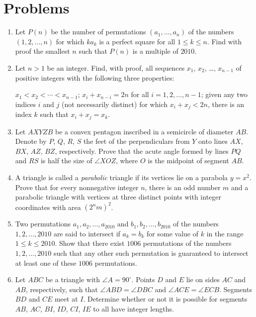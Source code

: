 \documentclass[11pt]{scrartcl}
\begin{document}
\section{Problems}
\begin{enumerate}[\bfseries 1.]
\item %
Let $P(n)$ be the number of permutations $(a_1, \dots, a_n)$
of the numbers $(1, 2, \dots, n)$ for which $ka_k$ is a perfect square
for all $1 \leq k \leq n$.
Find with proof the smallest $n$ such that $P (n)$ is a multiple of $2010$.

\item %
Let $n > 1$ be an integer.  Find, with proof, all sequences
$x_1$, $x_2$, \dots, $x_{n-1}$ of positive integers
with the following three properties:
\begin{enumerate}[(a)]
 \ii $x_1 < x_2 < \dotsb < x_{n-1}$;
 \ii $x_i + x_{n-i} = 2n$ for all $i = 1, 2, \dots , n - 1$;
 \ii given any two indices $i$ and $j$ (not necessarily distinct)
 for which $x_i + x_j < 2n$,
 there is an index $k$ such that $x_i + x_j = x_k$.
\end{enumerate}

\item %
Let $AXYZB$ be a convex pentagon inscribed in a semicircle of diameter $AB$.
Denote by $P$, $Q$, $R$, $S$ the feet of the perpendiculars
from $Y$ onto lines $AX$, $BX$, $AZ$, $BZ$, respectively.
Prove that the acute angle formed by lines $PQ$ and $RS$
is half the size of $\angle XOZ$,
where $O$ is the midpoint of segment $AB$.

\item %
A triangle is called a \emph{parabolic} triangle
if its vertices lie on a parabola $y = x^2$.
Prove that for every nonnegative integer $n$,
there is an odd number $m$ and a parabolic triangle
with vertices at three distinct points
with integer coordinates with area $(2^nm)^2$.

\item %
Two permutations $a_1,a_2,\dots,a_{2010}$
and $b_1,b_2,\dots,b_{2010}$ of the numbers $1,2,\dots,2010$
are said to intersect if $a_k=b_k$ for some value of $k$ in the range $1\le k\le 2010$.
Show that there exist $1006$ permutations of the numbers $1,2,\dots,2010$
such that any other such permutation is guaranteed to
intersect at least one of these $1006$ permutations.

\item %
Let $ABC$ be a triangle with $\angle A = 90^{\circ}$. Points $D$ and $E$ lie on sides $AC$ and $AB$, respectively, such that $\angle ABD = \angle DBC$ and $\angle ACE = \angle ECB$. Segments $BD$ and $CE$ meet at $I$. Determine whether or not it is possible for segments $AB$, $AC$, $BI$, $ID$, $CI$, $IE$ to all have integer lengths.

\end{enumerate}
\pagebreak
\end{document}

